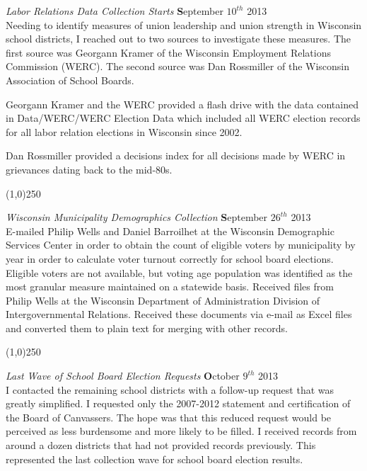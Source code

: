 {\em Labor Relations Data Collection Starts} \hfill {\textbf September $10^{th}$ 2013}\\

Needing to identify measures of union leadership and union strength in Wisconsin 
school districts, I reached out to two sources to investigate these measures. The 
first source was Georgann Kramer of the Wisconsin Employment Relations Commission (WERC). 
The second source was Dan Rossmiller of the Wisconsin Association of School Boards. 

Georgann Kramer and the WERC provided a flash drive with the data contained in 
Data/WERC/WERC Election Data which included all WERC election records for all 
labor relation elections in Wisconsin since 2002. 

Dan Rossmiller provided a decisions index for all decisions made by WERC in grievances 
dating back to the mid-80s. 


\begin{center}
\line(1,0){250}
\end{center}

{\em Wisconsin Municipality Demographics Collection} \hfill {\textbf September $26^{th}$ 2013}\\

E-mailed Philip Wells and Daniel Barroilhet at the Wisconsin Demographic Services Center
in order to obtain the count of eligible voters by municipality by year in order to 
calculate voter turnout correctly for school board elections. Eligible voters 
are not available, but voting age population was identified as the most granular 
measure maintained on a statewide basis. Received files from Philip Wells at the 
Wisconsin Department of Administration Division of Intergovernmental Relations. 
Received these documents via e-mail as Excel files and converted them to plain 
text for merging with other records. 


\begin{center}
\line(1,0){250}
\end{center}

{\em Last Wave of School Board Election Requests} \hfill {\textbf October $9^{th}$ 2013}\\

I contacted the remaining school districts with a follow-up request that was 
greatly simplified. I requested only the 2007-2012 statement and certification 
of the Board of Canvassers. The hope was that this reduced request would be 
perceived as less burdensome and more likely to be filled. I received records 
from around a dozen districts that had not provided records previously. This 
represented the last collection wave for school board election results. 

